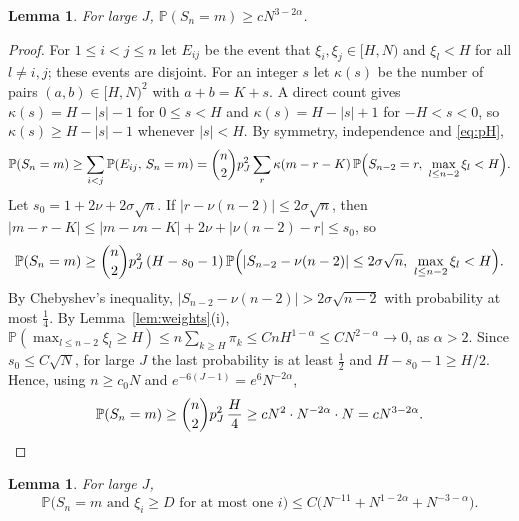 \documentclass[11pt]{amsart}
\newtheorem{lemma}[theorem]{Lemma}
\theoremstyle{remark}
\numberwithin{equation}{section}
\newcommand{\Pp}{\mathbb P}
\begin{document}
\begin{lemma}\label{lem:lower}
For large $J$, $\Pp(S_n=m)\ge cN^{3-2\alpha}$.
\end{lemma}

\begin{proof}
For $1\le i<j\le n$ let $E_{ij}$ be the event that $\xi_i,\xi_j\in[H,N)$ and $\xi_l<H$ for all $l\ne i,j$; these events are disjoint. For an integer $s$ let $\kappa(s)$ be the number of pairs $(a,b)\in[H,N)^2$ with $a+b=K+s$. A direct count gives $\kappa(s)=H-|s|-1$ for $0\le s<H$ and $\kappa(s)=H-|s|+1$ for $-H<s<0$, so $\kappa(s)\ge H-|s|-1$ whenever $|s|<H$. By symmetry, independence and \eqref{eq:pH},
\[
\Pp(S_n=m)\ge\sum_{i<j}\Pp(E_{ij},\,S_n=m)=\binom n2p_J^2\sum_r\kappa(m-r-K)\,\Pp\Bigl(S_{n-2}=r,\ \max_{l\le n-2}\xi_l<H\Bigr).
\]
Let $s_0=1+2\nu+2\sigma\sqrt n$. If $|r-\nu(n-2)|\le2\sigma\sqrt n$, then $|m-r-K|\le|m-\nu n-K|+2\nu+|\nu(n-2)-r|\le s_0$, so
\[
\Pp(S_n=m)\ge\binom n2p_J^2\,(H-s_0-1)\,\Pp\Bigl(|S_{n-2}-\nu(n-2)|\le2\sigma\sqrt n,\ \max_{l\le n-2}\xi_l<H\Bigr).
\]
By Chebyshev's inequality, $|S_{n-2}-\nu(n-2)|>2\sigma\sqrt{n-2}$ with probability at most $\frac14$. By Lemma~\ref{lem:weights}(i), $\Pp(\max_{l\le n-2}\xi_l\ge H)\le n\sum_{k\ge H}\pi_k\le CnH^{1-\alpha}\le CN^{2-\alpha}\to0$, as $\alpha>2$. Since $s_0\le C\sqrt N$, for large $J$ the last probability is at least $\frac12$ and $H-s_0-1\ge H/2$. Hence, using $n\ge c_0N$ and $e^{-6(J-1)}=e^6N^{-2\alpha}$,
\[
\Pp(S_n=m)\ge\binom n2p_J^2\,\frac H4\ge cN^2\cdot N^{-2\alpha}\cdot N=cN^{3-2\alpha}.\qedhere
\]
\end{proof}

\begin{lemma}\label{lem:upper}
For large $J$,
\[
\Pp\bigl(S_n=m\text{ and }\xi_i\ge D\text{ for at most one }i\bigr)\le C\bigl(N^{-11}+N^{1-2\alpha}+N^{-3-\alpha}\bigr).
\]
\end{lemma}
\end{document}
